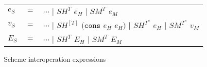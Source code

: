 \begin{figure}[p]
\label{sie}
\caption{Scheme interoperation expressions}
\begin{center}
\begin{tabular}{lcl}
$e_{S}$ & $=$ & $\cdots$ $\vert$ $SH^{T}$ $e_{H}$ $\vert$ $SM^{T}$ $e_{M}$ \\
$v_{S}$ & $=$ & $\cdots$ $\vert$ $SH^{[T]}$ $(\mathtt{cons}$ $e_{H}$ $e_{H})$ $\vert$ $SH^{T^{a}}$ $e_{H}$ $\vert$ $SM^{T^{a}}$ $v_{M}$ \\
$E_{S}$ & $=$ & $\cdots$ $\vert$ $SH^{T}$ $E_{H}$ $\vert$ $SM^{T}$ $E_{M}$
\end{tabular}
\end{center}
\end{figure}